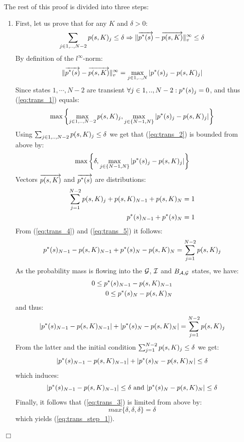 \documentclass[a4paper,11pt]{article}
\newenvironment{proof}{\trivlist \item[\hskip \labelsep{\bf Proof}]}{\hfill\hbox{$\Box$}\endtrivlist}
\begin{document}
\begin{proof}
		The rest of this proof is divided into three steps:
		\begin{enumerate}
			\item First, let us prove that for any $K$ and $\delta > 0$:
				\begin{equation}
					\sum_{j \in 1,..,N-2} p(s,K)_{j} \leq \delta \Rightarrow \lVert  \overrightarrow{p^{*}(s)} - \overrightarrow{p(s,K)}  \rVert_{v}^{\infty} \leq \delta
					\label{eq:trans_step_1}
				\end{equation}
				By definition of the $l^{\infty}$-norm:
				\begin{equation}
					\lVert  \overrightarrow{p^{*}(s)} - \overrightarrow{p(s,K)}  \rVert_{v}^{\infty} = \max_{j \in 1,..,N} | p^{*}(s)_{j} - p(s,K)_{j} | \label{eq:trans_1}
				\end{equation}
				Since states $1,\cdots,N-2$ are transient $\forall j \in 1,..,N-2 : p^{*}(s)_{j} =0 $, and thus (\ref{eq:trans_1}) equals:
				\begin{equation}
					\max \left\{ \max_{j \in 1,..,N-2} p(s,K)_{j}, \max_{j \in \{N-1,N \} } | p^{*}(s)_{j} - p(s,K)_{j} | \right\} \label{eq:trans_2}
				\end{equation}
				Using $\sum_{j \in 1,..,N-2} p(s,K)_{j} \leq \delta$ we get that (\ref{eq:trans_2}) is bounded from above by:
				\begin{equation}
					\max \left\{ \delta, \max_{ j \in \{N-1,N \} } | p^{*}(s)_{j} - p(s,K)_{j} | \right\} \label{eq:trans_3}
				\end{equation}
				Vectors $\overrightarrow{p(s,K)}$ and $\overrightarrow{p^{*}(s)}$ are distributions:
				\begin{eqnarray}
					\sum_{j=1}^{N-2} p(s,K)_{j} + p(s,K)_{N{-}1} + p(s,K)_{N} = 1 \label{eq:trans_4} \\
					p^{*}(s)_{N{-}1} + p^{*}(s)_{N} = 1 \label{eq:trans_5}
				\end{eqnarray}
				From (\ref{eq:trans_4}) and (\ref{eq:trans_5}) it follows:
				\[
					p^{*}(s)_{N{-}1} - p(s,K)_{N{-}1} + p^{*}(s)_{N} - p(s,K)_{N} = \sum_{j=1}^{N-2} p(s,K)_{j}
				\]
				As the probability mass is flowing into the $\mathcal{G}$, $\mathcal{I}$ and $B_{ \mathcal{A}, \mathcal{G} }$ states, we have:
				\begin{eqnarray}
					0 \leq p^{*}(s)_{N{-}1} - p(s,K)_{N{-}1} \nonumber \\
					0 \leq p^{*}(s)_{N} - p(s,K)_{N} \nonumber
				\end{eqnarray}
				and thus:
				\[
					|p^{*}(s)_{N{-}1} - p(s,K)_{N{-}1}| + |p^{*}(s)_{N} - p(s,K)_{N}| = \sum_{j=1}^{N-2} p(s,K)_{j}
				\]
				From the latter and the initial condition $\sum_{j=1}^{N-2} p(s,K)_{j} \leq \delta$ we get:
				\[
					|p^{*}(s)_{N{-}1} - p(s,K)_{N{-}1}| + |p^{*}(s)_{N} - p(s,K)_{N}| \leq \delta
				\]
				which induces:
				\[
					| p^{*}(s)_{N{-}1}- p(s,K)_{N{-}1} | \leq \delta \text{ and } | p^{*}(s)_{N} - p(s,K)_{N} | \leq \delta
				\]
				Finally, it follows that (\ref{eq:trans_3}) is limited from above by:
				\[
					max \{ \delta, \delta, \delta \} = \delta
				\]
				which yields (\ref{eq:trans_step_1}).
		

\end{enumerate}
\end{proof}
\end{document}
